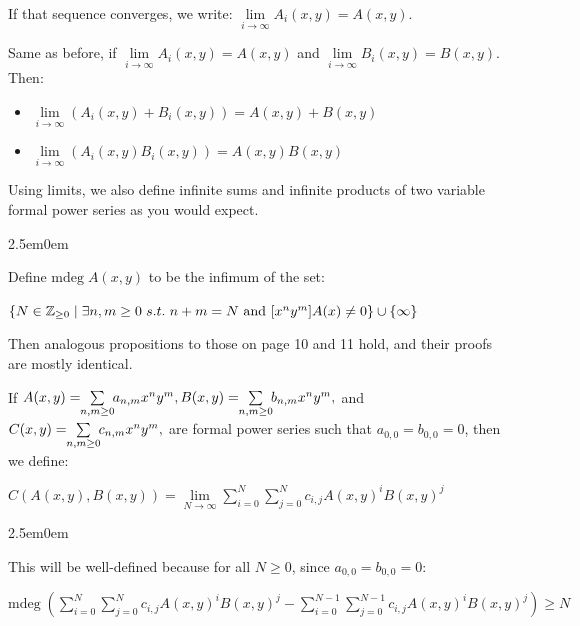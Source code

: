 \documentclass{book}
\newcommand{\hTwo}{%
\color{MidnightBlue}%
   \fontsize{13}{15}\selectfont%
}
\newenvironment{myIndent}{%
   \begin{adjustwidth}{2.5em}{0em}%
}{%
   \end{adjustwidth}%
}
\newcommand{\suchthat}{ \hspace{0.3em}s.t.\hspace{0.3em}}
\newcommand{\mdeg}{\mathrm{mdeg}\phantom{.}}
\newcommand{\retTwo}{\hfill\bigbreak}
\begin{document}
If that sequence converges, we write: $\lim\limits_{i \rightarrow \infty}A_i(x, y) = A(x, y)$.\retTwo

Same as before, if $\lim\limits_{i \rightarrow \infty} A_i(x, y) = A(x, y)$ and $\lim\limits_{i \rightarrow \infty} B_i(x, y) = B(x, y)$. Then:
\begin{itemize}
   \item $\lim\limits_{i \rightarrow \infty} (A_i(x, y) + B_i(x, y)) = A(x,y) + B(x, y)$
   \item $\lim\limits_{i \rightarrow \infty} (A_i(x, y)B_i(x, y)) = A(x,y)B(x,y)$\retTwo
\end{itemize}

Using limits, we also define infinite sums and infinite products of two variable formal power series as you would expect.

\begin{myIndent}\hTwo
   Define $\mdeg A(x, y)$ to be the infimum of the set:
   
   {\centering\fontsize{12}{14} $\{N \in \mathbb{Z}_{\geq 0} \mid \exists n, m \geq 0 \suchthat n + m = N \text{ and } [x^ny^m]A(x) \neq 0\} \cup \{\infty\}$\retTwo\par}
   
   Then analogous propositions to those on page 10 and 11 hold, and their proofs are mostly identical.\retTwo\retTwo

\end{myIndent}


If $A(x,y) = \hspace{-0.3em}\sum\limits_{n,m\geq 0}\hspace{-0.3em}a_{n,m}x^ny^m, B(x, y) = \hspace{-0.3em}\sum\limits_{n,m\geq 0}\hspace{-0.3em}b_{n,m}x^ny^m,$ and $C(x,y) = \hspace{-0.3em}\sum\limits_{n,m\geq 0}\hspace{-0.3em}c_{n,m}x^ny^m,$ are formal power series such that $a_{0,0} = b_{0,0} = 0$, then we define:\\ [-6pt]

{\centering $C(A(x, y), B(x, y)) = \lim\limits_{N \rightarrow \infty}\sum\limits_{i = 0}^N\sum\limits_{j=0}^N c_{i,j}A(x, y)^iB(x, y)^j$ \retTwo\par}

\begin{myIndent}\hTwo
   This will be well-defined because for all $N \geq 0$, since $a_{0,0} = b_{0,0} = 0$:
   
   {\centering$\mdeg\left(\sum\limits_{i = 0}^N\sum\limits_{j=0}^N c_{i,j}A(x, y)^iB(x, y)^j - \sum\limits_{i = 0}^{N-1}\sum\limits_{j=0}^{N-1} c_{i,j}A(x, y)^iB(x, y)^j\right) \geq N$\newpage\par}
\end{myIndent}
\end{document}
